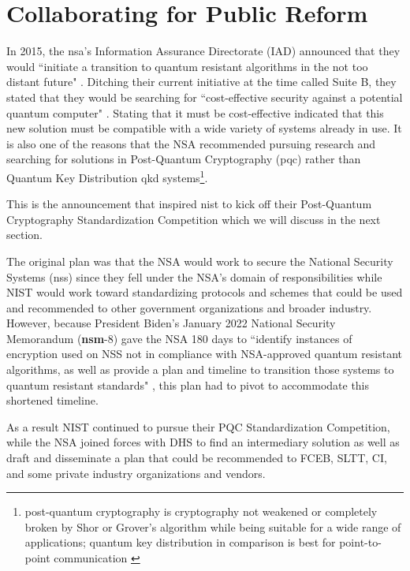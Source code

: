 \graphicspath{{Images/}}

\section{Collaborating for Public Reform} \label{government}
In 2015, the \gls{nsa}'s Information Assurance Directorate (IAD) announced that they would ``initiate a transition to quantum resistant algorithms in the not too distant future" \cite{moody_lets_2018}. Ditching their current initiative at the time called Suite B, they stated that they would be searching for ``cost-effective security against a potential quantum computer" \cite{2022_nsa}. Stating that it must be cost-effective indicated that this new solution must be compatible with a wide variety of systems already in use. It is also one of the reasons that the NSA recommended pursuing research and searching for solutions in Post-Quantum Cryptography (\gls{pqc}) rather than Quantum Key Distribution \gls{qkd} systems\footnote{post-quantum cryptography is cryptography not weakened or completely broken by Shor or Grover's algorithm while being suitable for a wide range of applications; quantum key distribution in comparison is best for point-to-point communication \cite{ee_web}}.  

This is the announcement that inspired \gls{nist} to kick off their Post-Quantum Cryptography Standardization Competition which we will discuss in the next section.

The original plan was that the NSA would work to secure the National Security Systems (\gls{nss}) since they fell under the NSA's domain of responsibilities while NIST would work toward standardizing protocols and schemes that could be used and recommended to other government organizations and broader industry. However, because President Biden's January 2022 National Security Memorandum (\textbf{\gls{nsm}}-8) gave the NSA 180 days to ``identify instances of encryption used on NSS not in compliance with NSA-approved quantum resistant algorithms, as well as provide a plan and timeline to transition those systems to quantum resistant standards" \cite{2022_nsa}, this plan had to pivot to accommodate this shortened timeline. 

As a result NIST continued to pursue their PQC Standardization Competition, while the NSA joined forces with DHS to find an intermediary solution as well as draft and disseminate a plan that could be recommended to FCEB, SLTT, CI, and some private industry organizations and vendors. 

